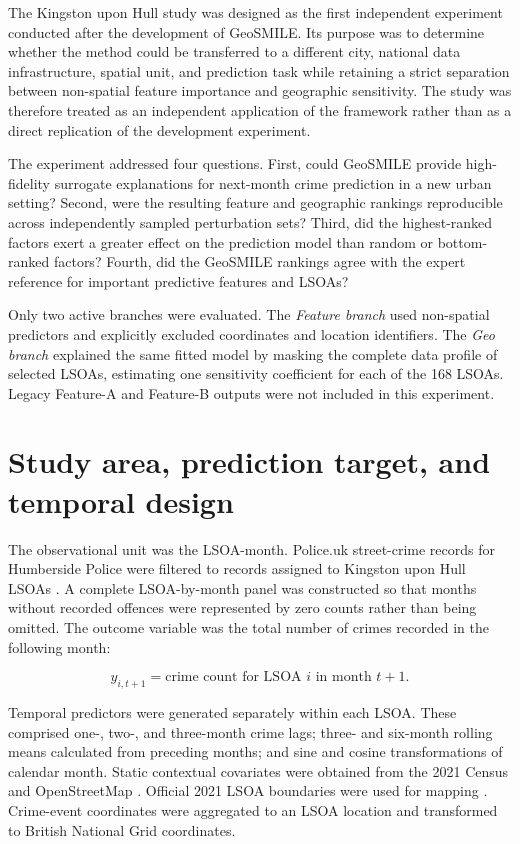 The Kingston upon Hull study was designed as the first independent experiment conducted after the development of GeoSMILE. Its purpose was to determine whether the method could be transferred to a different city, national data infrastructure, spatial unit, and prediction task while retaining a strict separation between non-spatial feature importance and geographic sensitivity. The study was therefore treated as an independent application of the framework rather than as a direct replication of the development experiment.

The experiment addressed four questions. First, could GeoSMILE provide high-fidelity surrogate explanations for next-month crime prediction in a new urban setting? Second, were the resulting feature and geographic rankings reproducible across independently sampled perturbation sets? Third, did the highest-ranked factors exert a greater effect on the prediction model than random or bottom-ranked factors? Fourth, did the GeoSMILE rankings agree with the expert reference for important predictive features and LSOAs?

Only two active branches were evaluated. The \emph{Feature branch} used non-spatial predictors and explicitly excluded coordinates and location identifiers. The \emph{Geo branch} explained the same fitted model by masking the complete data profile of selected LSOAs, estimating one sensitivity coefficient for each of the 168 LSOAs. Legacy Feature-A and Feature-B outputs were not included in this experiment.

\section{Study area, prediction target, and temporal design}
\label{sec:hull_data}

The observational unit was the LSOA-month. Police.uk street-crime records for Humberside Police were filtered to records assigned to Kingston upon Hull LSOAs \cite{policeuk}. A complete LSOA-by-month panel was constructed so that months without recorded offences were represented by zero counts rather than being omitted. The outcome variable was the total number of crimes recorded in the following month:

\begin{equation}
y_{i,t+1} = \text{crime count for LSOA } i \text{ in month } t+1.
\end{equation}

Temporal predictors were generated separately within each LSOA. These comprised one-, two-, and three-month crime lags; three- and six-month rolling means calculated from preceding months; and sine and cosine transformations of calendar month. Static contextual covariates were obtained from the 2021 Census and OpenStreetMap \cite{census2021,openstreetmap}. Official 2021 LSOA boundaries were used for mapping \cite{ons_lsoa2021}. Crime-event coordinates were aggregated to an LSOA location and transformed to British National Grid coordinates.

